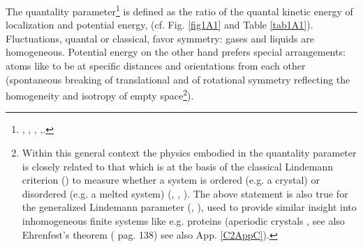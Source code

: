 The quantality parameter\footnote{\cite{Nosanow:76}, \cite{deBoer:57}, \cite{deBoer:48}, \cite{deBoer:48b},\cite{Mottelson:02}.} is defined as the ratio of the quantal kinetic energy of localization and potential energy, (cf. Fig. \ref{fig1A1} and Table \ref{tab1A1}).
 Fluctuations, quantal or classical, favor symmetry: gases and liquids are homogeneous. Potential energy on the other hand prefers special arrangements: atoms like to be at specific distances and orientations from each other (spontaneous breaking of translational and of rotational symmetry reflecting the homogeneity and isotropy of empty space\footnote{Within this general context the physics embodied in the quantality parameter is closely related to that which is at the basis of the classical Lindemann criterion (\cite{Lindemann:10}) to measure whether a system is ordered (e.g. a crystal) or disordered (e.g. a melted system) (\cite{Bilgram:87}, \cite{Lowen:94}, \cite{Stillinger:90,Stillinger:95}). The above statement is also true for the generalized Lindemann parameter (\cite{Stillinger:90}, \cite{Zhou:99}), used to provide similar insight into inhomogeneous finite systems like e.g. proteins (aperiodic crystals \cite{Schrodinger:44}, see also Ehrenfest's theorem (\cite{Basdevant:05} pag. 138) see also App. \ref{C2AppC}).}).
 
